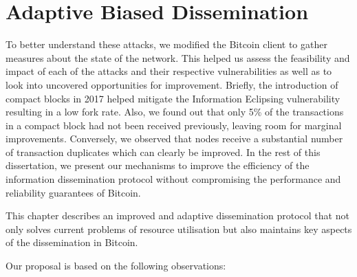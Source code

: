 \chapter{Adaptive Biased Dissemination}
\label{chap:arc}
To better understand these attacks, we modified the Bitcoin client to gather measures about the state of the network. This helped us assess the feasibility and impact of each of the attacks and their respective vulnerabilities as well as to look into uncovered opportunities for improvement. Briefly, the introduction of compact blocks in 2017 helped mitigate the Information Eclipsing vulnerability resulting in a low fork rate. Also, we found out that only 5\% of the transactions in a compact block had not been received previously, leaving room for marginal improvements. Conversely, we observed that nodes receive a substantial number of transaction duplicates which can clearly be improved. In the rest of this dissertation, we present our mechanisms to improve the efficiency of the information dissemination protocol without compromising the performance and reliability guarantees of Bitcoin.


This chapter describes an improved and adaptive dissemination protocol that not only solves current problems of resource utilisation but also maintains key aspects of the dissemination in Bitcoin.

Our proposal is based on the following observations:

